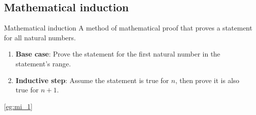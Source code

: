 \subsection{Mathematical induction}

\begin{definition}
    {Mathematical induction}
    A method of mathematical proof that proves a statement for all natural numbers.
    \begin{enumerate}
        \item \textbf{Base case}: Prove the statement for the first natural number in the statement's range.
        \item \textbf{Inductive step}: Assume the statement is true for $n$, then prove it is also true for $n+1$.
    \end{enumerate}
    \tcblower
    \ref{eg:mi_1}
    \label{def:mi}
\end{definition}